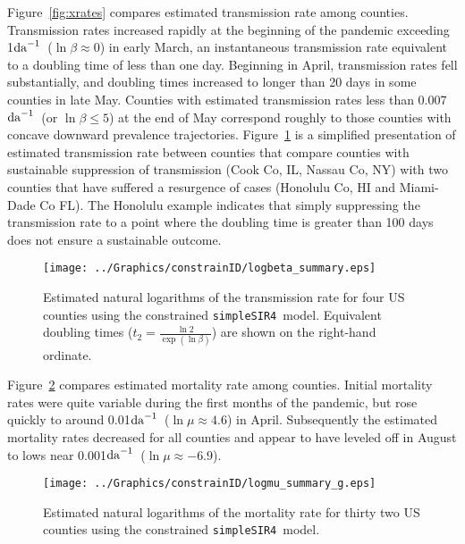 \documentclass[12pt,letterpaper]{article}
\newcommand\perda{$\rm{da}^{-1}$}
\newcommand\SSm{{\tt simpleSIR4}}
\begin{document}
Figure~\ref{fig:xrates} compares estimated transmission rate among
counties.
Transmission rates increased rapidly at the beginning of the pandemic
exceeding  1\perda\ ($\ln \beta \approx 0$) in early March, 
an instantaneous transmission rate
equivalent to a doubling time of less than one day.
Beginning in April, transmission rates fell substantially, and doubling times
increased to longer than 20 days in some counties in late May.
Counties with estimated transmission rates less than 0.007\perda\ 
(or $\ln \beta \le 5$) at the end of May
correspond roughly to those counties with concave downward prevalence
trajectories.
Figure~\ref{fig:xrates2} is a simplified presentation of estimated
transmission rate between counties that compare counties with sustainable
suppression of transmission (Cook Co, IL, Nassau Co, NY) with two counties that
have suffered a resurgence of cases (Honolulu Co, HI and Miami-Dade Co
FL). The Honolulu example indicates that simply suppressing the
transmission rate to a point where the doubling time is greater than
100 days does not ensure a sustainable outcome.

\begin{figure}[h!]
\begin{center}
\texttt{[image: ../Graphics/constrainID/logbeta\_summary.eps]}\\
\end{center}
\caption{\label{fig:xrates2}
Estimated natural logarithms of the transmission rate for four US
counties using the constrained \SSm\ model.
Equivalent doubling times ($t_2 = \frac{\ln 2}{\exp(\ln \beta)}$)
are shown on the right-hand ordinate.
}
\end{figure}

Figure~\ref{fig:drates} compares estimated mortality rate among
counties. Initial mortality rates were quite variable during the first
months of the pandemic, but rose quickly to around 
0.01\perda\ ($\ln \mu \approx 4.6$) in April. Subsequently the
estimated mortality rates decreased for all counties and appear to
have leveled off in August to lows near
0.001\perda\ ($\ln \mu \approx -6.9$).

\begin{figure}
\begin{center}
\texttt{[image: ../Graphics/constrainID/logmu\_summary\_g.eps]}\\
\end{center}
\caption{\label{fig:drates}
Estimated natural logarithms of the mortality rate for thirty two US
counties using the constrained \SSm\ model.
}
\end{figure}
\end{document}
